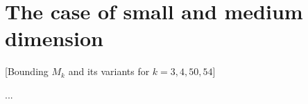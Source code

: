 \section{The case of small and medium dimension}\label{h1-sec}

[Bounding $M_k$ and its variants for $k = 3, 4, 50, 54$]

...